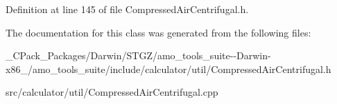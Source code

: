 Definition at line 145 of file Compressed\+Air\+Centrifugal.\+h.



The documentation for this class was generated from the following files\+:\begin{DoxyCompactItemize}
\item 
\+\_\+\+C\+Pack\+\_\+\+Packages/\+Darwin/\+S\+T\+G\+Z/amo\+\_\+tools\+\_\+suite-\/-\/\+Darwin-\/x86\+\_/amo\+\_\+tools\+\_\+suite/include/calculator/util/Compressed\+Air\+Centrifugal.\+h\item 
src/calculator/util/Compressed\+Air\+Centrifugal.\+cpp\end{DoxyCompactItemize}
